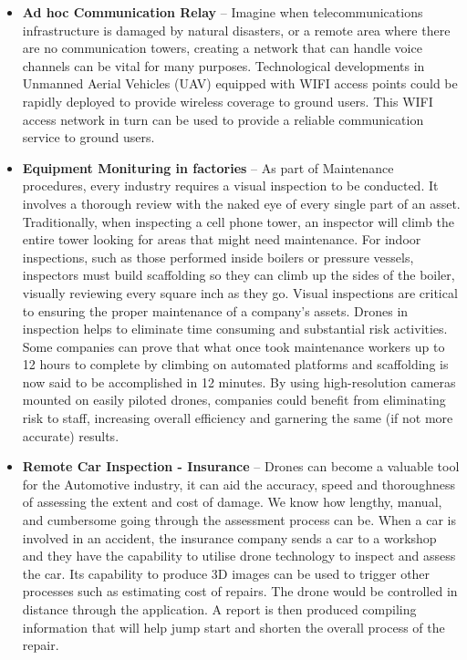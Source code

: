 \begin{itemize}
    \item \textbf{Ad hoc Communication Relay} -- Imagine when telecommunications infrastructure is damaged by natural disasters, or a remote area where there are no communication towers, creating a network that can handle voice channels can be vital for many purposes.
    Technological developments in Unmanned Aerial Vehicles (UAV) equipped with WIFI access points could be rapidly deployed to provide wireless coverage to ground users. This WIFI access network in turn can be used to provide a reliable communication service to ground users. 

    \item \textbf{Equipment Monituring in factories} -- As part of Maintenance procedures, every industry requires a visual inspection to be conducted. It involves a thorough review with the naked eye of every single part of an asset.
    Traditionally, when inspecting a cell phone tower, an inspector will climb the entire tower looking for areas that might need maintenance. For indoor inspections, such as those performed inside boilers or pressure vessels, inspectors must build scaffolding so they can climb up the sides of the boiler, visually reviewing every square inch as they go.
    Visual inspections are critical to ensuring the proper maintenance of a company's assets. Drones in inspection helps to eliminate time consuming and substantial risk activities.
    Some companies can prove that what once took maintenance workers up to 12 hours to complete by climbing on automated platforms and scaffolding is now said to be accomplished in 12 minutes. By using high-resolution cameras mounted on easily piloted drones, companies could benefit from eliminating risk to staff, increasing overall efficiency and garnering the same (if not more accurate) results. 

    \item \textbf{Remote Car Inspection - Insurance} -- Drones can become a valuable tool for the Automotive industry, it can aid the accuracy, speed and thoroughness of assessing the extent and cost of damage.
    We know how lengthy, manual, and cumbersome going through the assessment process can be. When a car is involved in an accident, the insurance company sends a car to a workshop and they have the capability to utilise drone technology to inspect and assess the car. Its capability to produce 3D images can be used to trigger other processes such as estimating cost of repairs.
    The drone would be controlled in distance through the application. A report is then produced compiling information that will help jump start and shorten the overall process of the repair. 
    

\end{itemize}
